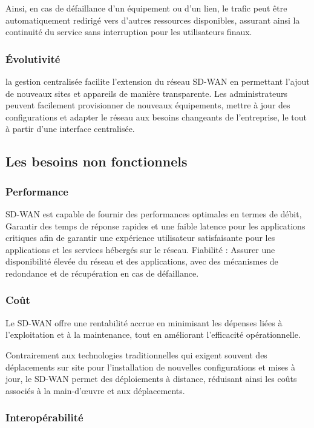 Ainsi, en cas de défaillance d'un équipement ou d'un lien, le trafic peut être automatiquement redirigé vers d'autres ressources disponibles, assurant ainsi la continuité du service sans interruption pour les utilisateurs finaux.

\subsubsection{Évolutivité }

la gestion centralisée facilite l'extension du réseau SD-WAN en permettant l'ajout de nouveaux sites et appareils de manière transparente. Les administrateurs peuvent facilement provisionner de nouveaux équipements, mettre à jour des configurations et adapter le réseau aux besoins changeants de l'entreprise, le tout à partir d'une interface centralisée.

\subsection{Les besoins non fonctionnels }
\subsubsection{Performance   }

SD-WAN est capable de fournir des performances optimales en termes de débit, Garantir des temps de réponse rapides et une faible latence pour les applications critiques afin de garantir une expérience utilisateur satisfaisante pour les applications et les services hébergés sur le réseau.
Fiabilité : Assurer une disponibilité élevée du réseau et des applications, avec des mécanismes de redondance et de récupération en cas de défaillance.


\subsubsection{Coût  }

Le SD-WAN offre une rentabilité accrue en minimisant les dépenses liées à l'exploitation et à la maintenance, tout en améliorant l'efficacité opérationnelle.

 Contrairement aux technologies traditionnelles qui exigent souvent des déplacements sur site pour l'installation de nouvelles configurations et mises à jour, le SD-WAN permet des déploiements à distance, réduisant ainsi les coûts associés à la main-d'œuvre et aux déplacements.

\subsubsection{Interopérabilité  }

